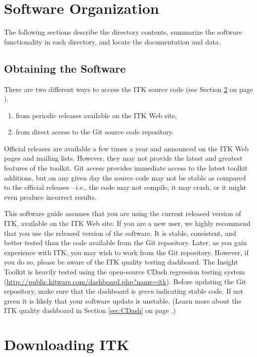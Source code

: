 \section{Software Organization}
\label{sec:SoftwareOrganization}

The following sections describe the directory contents, summarize the
software functionality in each directory, and locate the documentation and
data.

\subsection{Obtaining the Software}
\label{sec:ObtainingTheSoftware}

There are two different ways to access the ITK source code
(see Section \ref{sec:DownloadingITK} on page \pageref{sec:DownloadingITK}).
\begin{enumerate}
	\item	from periodic releases available on the ITK Web site,
	\item	from direct access to the Git source code repository.
\end{enumerate}
Official releases are available a few times a year and announced on the ITK
Web pages and mailing lists. However, they may not provide the latest and
greatest features of the toolkit. Git access provides immediate access to the
latest toolkit additions, but on any given day the source code may not be
stable as compared to the official releases---i.e., the code may not compile,
it may crash, or it might even produce incorrect results.

This software guide assumes that you are using the current released
version of ITK, available on the ITK Web site. If you are a new user,
we highly recommend that you use the released version of the
software. It is stable, consistent, and better tested than the code
available from the Git repository. Later, as you gain experience with
ITK, you may wish to work from the Git repository. However, if you do
so, please be aware of the ITK quality testing dashboard. The Insight
Toolkit is heavily tested using the open-source CDash regression
testing system
(\url{http://public.kitware.com/dashboard.php?name=itk}). Before
updating the Git repository, make sure that the dashboard is
\emph{green} indicating stable code. If not green it is likely that
your software update is unstable. (Learn more about the ITK quality
dashboard in Section \ref{sec:CDash} on page \pageref{sec:CDash}.)

\section{Downloading ITK}
\label{sec:DownloadingITK}

